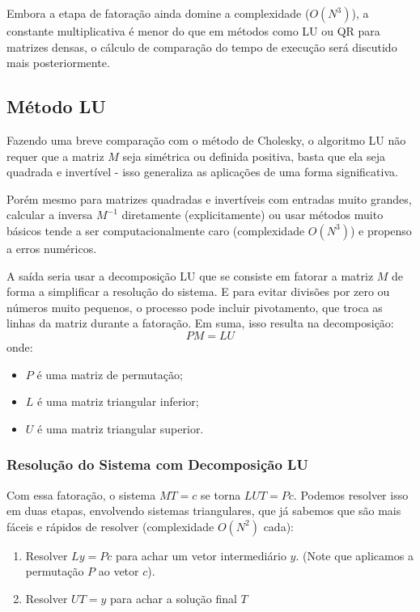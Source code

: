 \documentclass{article}
\begin{document}
    Embora a etapa de fatoração ainda domine a complexidade ($O(N^3)$), a constante multiplicativa é menor do que em métodos como LU ou QR para matrizes densas, o cálculo de comparação do tempo de execução será discutido mais posteriormente.

    \subsection{Método LU}

    Fazendo uma breve comparação com o método de Cholesky, o algoritmo LU não requer que a matriz $M$ seja simétrica ou definida positiva, basta que ela seja quadrada e invertível - isso generaliza as aplicações de uma forma significativa.

    Porém mesmo para matrizes quadradas e invertíveis com entradas muito grandes, calcular a inversa $M^{-1}$ diretamente (explicitamente) ou usar métodos muito básicos tende a ser computacionalmente caro (complexidade $O(N^3)$) e propenso a erros numéricos.

    A saída seria usar a decomposição LU que se consiste em fatorar a matriz $M$ de forma a simplificar a resolução do sistema. E para evitar divisões por zero ou números muito pequenos, o processo pode incluir pivotamento, que troca as linhas da matriz durante a fatoração. Em suma, isso resulta na decomposição:
    \[ PM = LU \]
    onde:

    \begin{itemize}[leftmargin=*]
        \item $P$ é uma matriz de permutação;
        \item $L$ é uma matriz triangular inferior;
        \item $U$ é uma matriz triangular superior.
    \end{itemize}

    \subsubsection{Resolução do Sistema com Decomposição LU}

    Com essa fatoração, o sistema $MT = c$ se torna $LUT = Pc$. Podemos resolver isso em duas etapas, envolvendo sistemas triangulares, que já sabemos que são mais fáceis e rápidos de resolver (complexidade $O(N^2)$ cada):

    \begin{enumerate}
        \item Resolver $Ly = Pc$ para achar um vetor intermediário $y$. (Note que aplicamos a permutação $P$ ao vetor $c$).
        \item Resolver $UT = y$ para achar a solução final $T$
    \end{enumerate}
\end{document}
